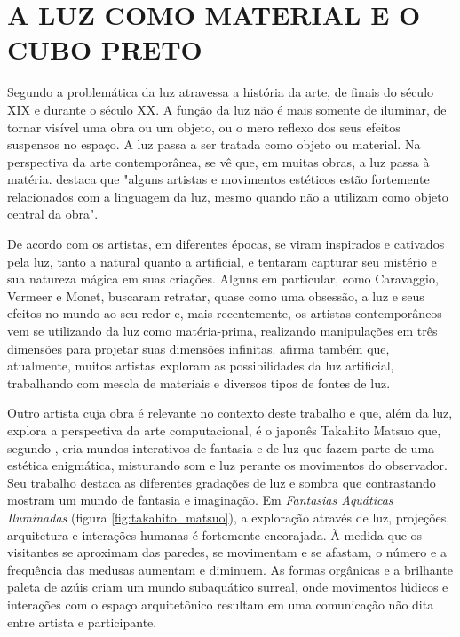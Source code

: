 \chapter{A LUZ COMO MATERIAL E O CUBO PRETO}

Segundo  a problemática da luz atravessa a história da arte, de finais do século XIX e durante o século XX. A função da luz não é mais somente de iluminar, de tornar visível uma obra ou um objeto, ou o mero reflexo dos seus efeitos suspensos no espaço. A luz passa a ser tratada como objeto ou material. Na perspectiva da arte contemporânea, se vê que, em muitas obras, a luz passa à matéria.  destaca que "alguns artistas e movimentos estéticos estão fortemente relacionados com a linguagem da luz, mesmo quando não a utilizam como objeto central da obra". 

De acordo com  os artistas, em diferentes épocas, se viram inspirados e cativados pela luz, tanto a natural quanto a artificial, e tentaram capturar seu mistério e sua natureza mágica em suas criações. Alguns em particular, como Caravaggio, Vermeer e Monet, buscaram retratar, quase como uma obsessão, a luz e seus efeitos no mundo ao seu redor e, mais recentemente, os artistas contemporâneos vem se utilizando da luz como matéria-prima, realizando manipulações em três dimensões para projetar suas dimensões infinitas.  afirma também que, atualmente, muitos artistas exploram as possibilidades da luz artificial, trabalhando com mescla de materiais e diversos tipos de fontes de luz. 

Outro artista cuja obra é relevante no contexto deste trabalho e que, além da luz, explora a perspectiva da arte computacional, é o japonês Takahito Matsuo que, segundo , cria mundos interativos de fantasia e de luz que fazem parte de uma estética enigmática, misturando som e luz perante os movimentos do observador. Seu trabalho destaca as diferentes gradações de luz e sombra que contrastando mostram um mundo de fantasia e imaginação. Em \textit{Fantasias Aquáticas Iluminadas} (figura \ref{fig:takahito_matsuo}), a exploração através de luz, projeções, arquitetura e interações humanas é fortemente encorajada. À medida que os visitantes se aproximam das paredes, se movimentam e se afastam, o número e a frequência das medusas aumentam e diminuem. As formas orgânicas e a brilhante paleta de azúis criam um mundo subaquático surreal, onde movimentos lúdicos e interações com o espaço arquitetônico resultam em uma comunicação não dita entre artista e participante. 

